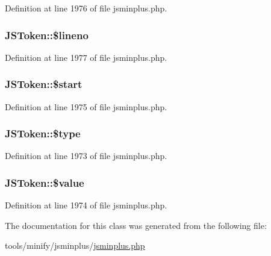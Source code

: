 Definition at line 1976 of file jsminplus.\+php.

\hypertarget{classJSToken_a47d1838d4f5a136b02e8271c9dfb2a27}{
\subsubsection[{\$lineno}]{\setlength{\rightskip}{0pt plus 5cm}J\+S\+Token\+::\$lineno}}\label{classJSToken_a47d1838d4f5a136b02e8271c9dfb2a27}


Definition at line 1977 of file jsminplus.\+php.

\hypertarget{classJSToken_ae5b7c81970110aeeab2ac5f65a68fdcc}{
\subsubsection[{\$start}]{\setlength{\rightskip}{0pt plus 5cm}J\+S\+Token\+::\$start}}\label{classJSToken_ae5b7c81970110aeeab2ac5f65a68fdcc}


Definition at line 1975 of file jsminplus.\+php.

\hypertarget{classJSToken_af6eb7c362602c2408bb2047d835e358c}{
\subsubsection[{\$type}]{\setlength{\rightskip}{0pt plus 5cm}J\+S\+Token\+::\$type}}\label{classJSToken_af6eb7c362602c2408bb2047d835e358c}


Definition at line 1973 of file jsminplus.\+php.

\hypertarget{classJSToken_aed0c48e3c23480420db576e267a79b60}{
\subsubsection[{\$value}]{\setlength{\rightskip}{0pt plus 5cm}J\+S\+Token\+::\$value}}\label{classJSToken_aed0c48e3c23480420db576e267a79b60}


Definition at line 1974 of file jsminplus.\+php.



The documentation for this class was generated from the following file\+:\begin{DoxyCompactItemize}
\item 
tools/minify/jsminplus/\hyperlink{jsminplus_8php}{jsminplus.\+php}\end{DoxyCompactItemize}
